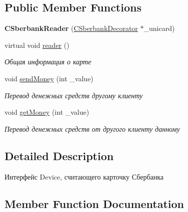 \subsection*{Public Member Functions}
\begin{DoxyCompactItemize}
\item 
\mbox{\label{classCSberbankReader_abf9c9be6b446d32f681ff5f80576c5f0}} 
{\bfseries C\+Sberbank\+Reader} (\hyperlink{classCSberbankDecorator}{C\+Sberbank\+Decorator} $\ast$\+\_\+unicard)
\item 
\mbox{\label{classCSberbankReader_a4dd1f87a1f3272b9028605f00518194b}} 
virtual void \hyperlink{classCSberbankReader_a4dd1f87a1f3272b9028605f00518194b}{reader} ()
\begin{DoxyCompactList}\small\item\em Общая информация о карте \end{DoxyCompactList}\item 
void \hyperlink{classCSberbankReader_a8956f7c08e0bbffc81f432d4fe3408f3}{send\+Money} (int \+\_\+value)
\begin{DoxyCompactList}\small\item\em Перевод денежных средств другому клиенту \end{DoxyCompactList}\item 
void \hyperlink{classCSberbankReader_ad68d4071db0050cc18b0a79fcfa1c2f9}{get\+Money} (int \+\_\+value)
\begin{DoxyCompactList}\small\item\em Перевод денежных средств от другого клиенту данному \end{DoxyCompactList}\end{DoxyCompactItemize}


\subsection{Detailed Description}
Интерфейс Device, считающего карточку Сбербанка 

\subsection{Member Function Documentation}
\mbox{\label{classCSberbankReader_ad68d4071db0050cc18b0a79fcfa1c2f9}} 
